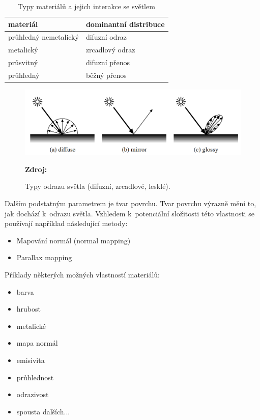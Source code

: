 \begin{table}[H]
	\centering
	\begin{tabular}{|l|l|}
		\hline
		materiál              & dominantní distribuce \\ \hline
		průhledný nemetalický & difuzní odraz         \\ \hline
		metalický             & zrcadlový odraz       \\ \hline
		průsvitný             & difuzní přenos        \\ \hline
		průhledný             & běžný přenos          \\ \hline
	\end{tabular}
	\caption{Typy materiálů a jejich interakce se světlem}
\end{table}

\begin{figure}[H]
	\centering
	\includegraphics[scale=1]{obrazky-figures/reflection_types.png}
	\caption{Typy odrazu světla (difuzní, zrcadlové, lesklé).}
	\textbf{Zdroj: \cite{materials}}
	\label{fig:3d_grid}
\end{figure}

Dalším podstatným parametrem je tvar povrchu. Tvar povrchu výrazně mění to, jak dochází k~odrazu světla. Vzhledem k~potenciální složitosti této vlastnosti se používají například následující metody:

\begin{itemize}
	\item Mapování normál (normal mapping)
	\item Parallax mapping
\end{itemize}

Příklady některých možných vlastností materiálů:

\begin{itemize}
	\item barva
	\item hrubost
	\item metalické
	\item mapa normál
	\item emisivita
	\item průhlednost
	\item odrazivost
	\item spousta dalších...
\end{itemize}



